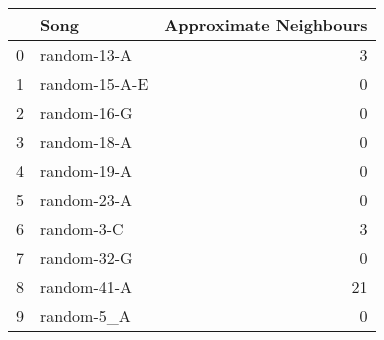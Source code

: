 \begin{tabular}{llr}
\toprule
 & Song & Approximate Neighbours \\
\midrule
0 & random-13-A & 3 \\
1 & random-15-A-E & 0 \\
2 & random-16-G & 0 \\
3 & random-18-A & 0 \\
4 & random-19-A & 0 \\
5 & random-23-A & 0 \\
6 & random-3-C & 3 \\
7 & random-32-G & 0 \\
8 & random-41-A & 21 \\
9 & random-5_A & 0 \\
\bottomrule
\end{tabular}
